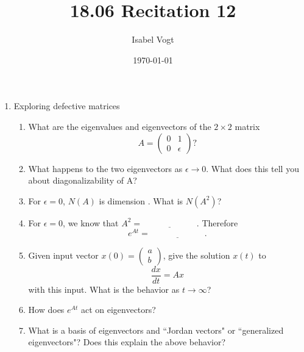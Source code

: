\documentclass[11pt]{article}
\title{18.06 Recitation 12}
\author{Isabel Vogt}
\date{\today}                                           %
\begin{document}
\maketitle

\begin{enumerate}


\item Exploring defective matrices
\begin{enumerate}
\item What are the eigenvalues and eigenvectors of the $2 \times 2$ matrix
\[A = \begin{pmatrix} 0 & 1 \\ 0 & \epsilon \end{pmatrix}?\]
\item What happens to the two eigenvectors as $\epsilon \to 0$.  What does this tell you about diagonalizability of A?
\item For $\epsilon = 0$, $N(A)$ is dimension \underline{\phantom{aaaaaaaaaaaa}}.  What is $N(A^2)$?
\item For $\epsilon = 0$, we know that $A^2 =  \underline{\phantom{aaaaaaaaaaaa}}$.  Therefore
\[e^{At} = \underline{\phantom{aaaaaaaaaaaa}}. \]
\item Given input vector $x(0) = \begin{pmatrix} a \\ b \end{pmatrix}$, give the solution $x(t)$ to 
\[\frac{dx}{dt} = A x \]
with this input.  What is the behavior as $t\to \infty$?
\item How does $e^{At}$ act on eigenvectors?
\item What is a basis of eigenvectors and ``Jordan vectors" or ``generalized eigenvectors"?  Does this explain the above behavior?


\end{enumerate}
\end{enumerate}
\end{document}
